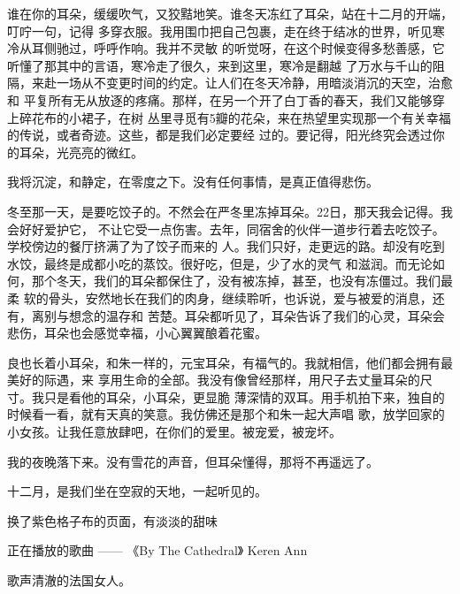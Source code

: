 \documentclass[12pt,a4paper]{article}
\begin{document}
		谁在你的耳朵，缓缓吹气，又狡黠地笑。谁冬天冻红了耳朵，站在十二月的开端，叮咛一句，记得
	多穿衣服。我用围巾把自己包裹，走在终于结冰的世界，听见寒冷从耳侧驰过，呼呼作响。我并不灵敏
	的听觉呀，在这个时候变得多愁善感，它听懂了那其中的言语，寒冷走了很久，来到这里，寒冷是翻越
	了万水与千山的阻隔，来赴一场从不变更时间的约定。让人们在冬天冷静，用暗淡消沉的天空，治愈和
	平复所有无从放逐的疼痛。那样，在另一个开了白丁香的春天，我们又能够穿上碎花布的小裙子，在树
	丛里寻觅有5瓣的花朵，来在热望里实现那一个有关幸福的传说，或者奇迹。这些，都是我们必定要经
	过的。要记得，阳光终究会透过你的耳朵，光亮亮的微红。


		我将沉淀，和静定，在零度之下。没有任何事情，是真正值得悲伤。


		冬至那一天，是要吃饺子的。不然会在严冬里冻掉耳朵。22日，那天我会记得。我会好好爱护它，
	不让它受一点伤害。去年，同宿舍的伙伴一道步行着去吃饺子。学校傍边的餐厅挤满了为了饺子而来的
	人。我们只好，走更远的路。却没有吃到水饺，最终是成都小吃的蒸饺。很好吃，但是，少了水的灵气
	和滋润。而无论如何，那个冬天，我们的耳朵都保住了，没有被冻掉，甚至，也没有冻僵过。我们最柔
	软的骨头，安然地长在我们的肉身，继续聆听，也诉说，爱与被爱的消息，还有，离别与想念的温存和
	苦楚。耳朵都听见了，耳朵告诉了我们的心灵，耳朵会悲伤，耳朵也会感觉幸福，小心翼翼酿着花蜜。


		良也长着小耳朵，和朱一样的，元宝耳朵，有福气的。我就相信，他们都会拥有最美好的际遇，来
	享用生命的全部。我没有像曾经那样，用尺子去丈量耳朵的尺寸。我只是看他的耳朵，小耳朵，更显脆
	薄深情的双耳。用手机拍下来，独自的时候看一看，就有天真的笑意。我仿佛还是那个和朱一起大声唱
	歌，放学回家的小女孩。让我任意放肆吧，在你们的爱里。被宠爱，被宠坏。


		我的夜晚落下来。没有雪花的声音，但耳朵懂得，那将不再遥远了。

		十二月，是我们坐在空寂的天地，一起听见的。


		换了紫色格子布的页面，有淡淡的甜味

		正在播放的歌曲 —— 《By The Cathedral》 Keren Ann

		歌声清澈的法国女人。

\end{document}

